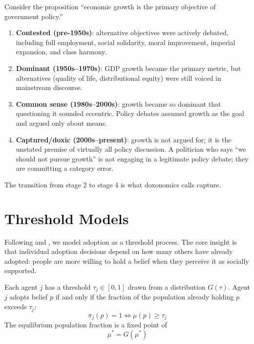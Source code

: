 \begin{example}
\label{ex:stages-capture}
Consider the proposition ``economic growth is the primary objective of government policy.''
\begin{enumerate}[nosep]
  \item \textbf{Contested (pre-1950s)}: alternative objectives were actively debated, including full employment, social solidarity, moral improvement, imperial expansion, and class harmony.
  \item \textbf{Dominant (1950s--1970s)}: GDP growth became the primary metric, but alternatives (quality of life, distributional equity) were still voiced in mainstream discourse.
  \item \textbf{Common sense (1980s--2000s)}: growth became so dominant that questioning it sounded eccentric. Policy debates assumed growth as the goal and argued only about means.
  \item \textbf{Captured/doxic (2000s--present)}: growth is not argued for; it is the unstated premise of virtually all policy discussion. A politician who says ``we should not pursue growth'' is not engaging in a legitimate policy debate; they are committing a category error.
\end{enumerate}
The transition from stage 2 to stage 4 is what doxonomics calls capture.
\end{example}


\section{Threshold Models}
\label{sec:ch8-thresholds}

Following \textcite{granovetter1978} and \textcite{schelling1978}, we model adoption as a threshold process.
The core insight is that individual adoption decisions depend on how many others have already adopted: people are more willing to hold a belief when they perceive it as socially supported.

\begin{model}
\label{mod:granovetter}
Each agent $j$ has a threshold $\tau_j \in [0,1]$ drawn from a distribution $G(\tau)$.
Agent $j$ adopts belief $p$ if and only if the fraction of the population already holding $p$ exceeds $\tau_j$:
\[
  \pi_j(p) = 1 \iff \mu(p) \geq \tau_j
\]
The equilibrium population fraction is a fixed point of
\[
  \mu^* = G(\mu^*)
\]
\end{model}

